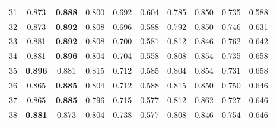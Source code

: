 \begin{table}[]
\begin{tabular}{|c|ccccccccc|}
31   & 0.873                            & \textbf{0.888}               & 0.800                              & 0.692                             & 0.604                    & 0.785                             & 0.850                             & 0.735                            & 0.588                       \\ \cline{1-1}
32   & 0.873                            & \textbf{0.892}               & 0.808                              & 0.696                             & 0.588                    & 0.792                             & 0.850                             & 0.746                            & 0.631                       \\ \cline{1-1}
33   & 0.881                            & \textbf{0.892}               & 0.808                              & 0.700                             & 0.581                    & 0.812                             & 0.846                             & 0.762                            & 0.642                       \\ \cline{1-1}
34   & 0.881                            & \textbf{0.896}               & 0.804                              & 0.704                             & 0.558                    & 0.808                             & 0.854                             & 0.735                            & 0.658                       \\ \cline{1-1}
35   & \textbf{0.896}                   & 0.881                        & 0.815                              & 0.712                             & 0.585                    & 0.804                             & 0.854                             & 0.731                            & 0.658                       \\ \cline{1-1}
36   & 0.865                            & \textbf{0.885}               & 0.804                              & 0.712                             & 0.588                    & 0.815                             & 0.850                             & 0.750                            & 0.646                       \\ \hline
37   & 0.865                            & \textbf{0.885}               & 0.796                              & 0.715                             & 0.577                    & 0.812                             & 0.862                             & 0.727                            & 0.646                       \\ \cline{1-1}
38   & \textbf{0.881}                   & 0.873                        & 0.804                              & 0.738                             & 0.577                    & 0.808                             & 0.846                             & 0.754                            & 0.646                       \\ \cline{1-1}

\end{tabular}
\end{table}
